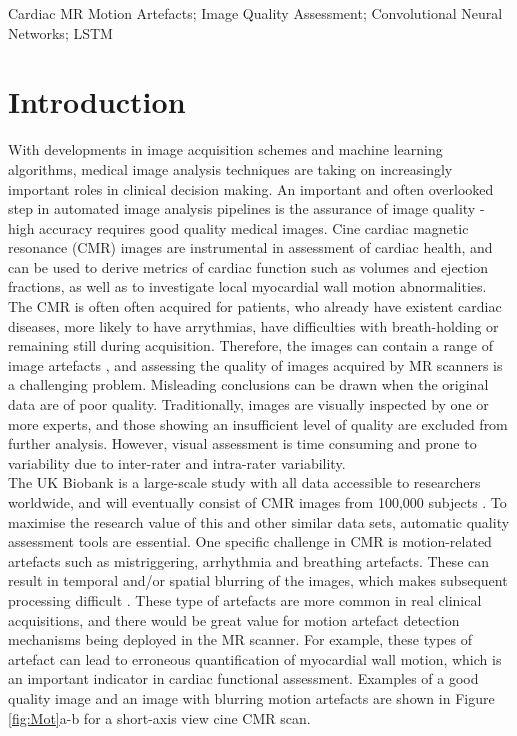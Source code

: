 \documentclass[preprint,12pt,authoryear]{elsarticle}
\begin{document}
\begin{frontmatter}
\begin{abstract}
\end{abstract}
\begin{keyword}
Cardiac MR Motion Artefacts; Image Quality Assessment; Convolutional Neural Networks; LSTM
\end{keyword}
\end{frontmatter}



\section{Introduction}
\label{sec:introduction}

With developments in image acquisition schemes and machine learning algorithms, medical image analysis techniques are taking on increasingly important roles in clinical decision making.
An important and often overlooked step in automated image analysis pipelines is the assurance of image quality - high accuracy requires good quality medical images. Cine  cardiac magnetic resonance (CMR) images are instrumental in assessment of cardiac health, and can be used to derive metrics of cardiac function such as volumes and ejection fractions, as well as to investigate local myocardial wall motion abnormalities.  The CMR is often often acquired for patients, who already have existent cardiac diseases, more likely to have arrythmias, have difficulties with breath-holding  or remaining still during acquisition. Therefore, the images can contain a range of image artefacts \citep{Ferreira2013}, and assessing the quality of images acquired by MR scanners is a challenging problem. Misleading conclusions can be drawn when the original data are of poor quality. Traditionally, images are visually inspected by one or more experts, and those showing an insufficient level of quality are excluded from further analysis. However, visual assessment is time consuming and prone to variability due to inter-rater and intra-rater variability.\\

The UK Biobank is a large-scale study with all data accessible to researchers worldwide, and will eventually consist of CMR images from 100,000 subjects \citep{Petersen2015}. To maximise the research value of this and other similar data sets, automatic quality assessment tools are essential. One specific challenge in CMR is motion-related artefacts such as mistriggering, arrhythmia and breathing artefacts. These can result in temporal and/or spatial blurring of the images, which makes subsequent processing difficult \citep{Ferreira2013}. These type of artefacts are more common in real clinical acquisitions, and there would be great value for motion artefact detection mechanisms being deployed in the MR scanner.
For example, these types of artefact can lead to erroneous quantification of myocardial wall motion, which is an important indicator in cardiac functional assessment. Examples of a good quality image and an image with blurring motion artefacts are shown in Figure \ref{fig:Mot}a-b for a short-axis view cine CMR scan.\\
\end{document}
